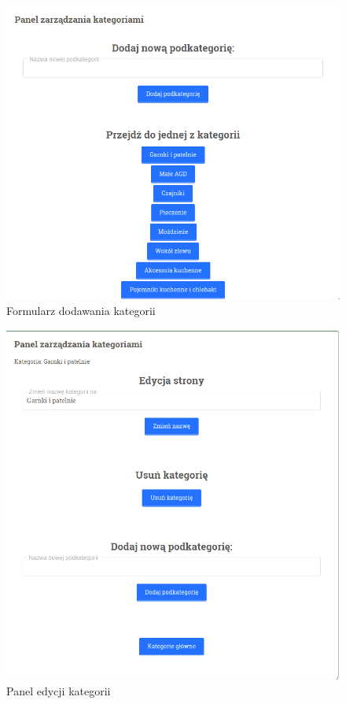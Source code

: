 \begin{figure}[H]
	\centering
	\includegraphics [width=15cm] {fig/dodawanie_kat}
	\caption{Formularz dodawania kategorii}
	\label{fig:dod_kat}
\end{figure}
\begin{figure}[H]
	\centering
	\includegraphics [width=15cm]{fig/edycja_kategorii}
	\caption{Panel edycji kategorii}
	\label{fig:e_kat}
\end{figure}
